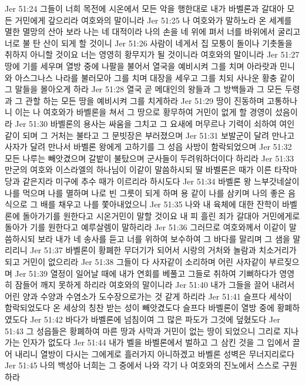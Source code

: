 Jer 51:24  그들이 너희 목전에 시온에서 모든 악을 행한대로 내가 바벨론과 갈대아 모든 거민에게 갚으리라 여호와의 말이니라
Jer 51:25  나 여호와가 말하노라 온 세계를 멸한 멸망의 산아 보라 나는 네 대적이라 나의 손을 네 위에 펴서 너를 바위에서 굴리고 너로 불 탄 산이 되게 할 것이니
Jer 51:26  사람이 네게서 집 모퉁이 돌이나 기촛돌을 취하지 아니할 것이요 너는 영영히 황무지가 될 것이니라 여호와의 말이니라
Jer 51:27  땅에 기를 세우며 열방 중에 나팔을 불어서 열국을 예비시켜 그를 치며 아라랏과 민니와 아스그나스 나라를 불러모아 그를 치며 대장을 세우고 그를 치되 사나운 황충 같이 그 말들을 몰아오게 하라
Jer 51:28  열국 곧 메대인의 왕들과 그 방백들과 그 모든 두령과 그 관할 하는 모든 땅을 예비시켜 그를 치게하라
Jer 51:29  땅이 진동하며 고통하나니 이는 나 여호와가 바벨론을 쳐서 그 땅으로 황무하여 거민이 없게 할 경영이 섰음이라
Jer 51:30  바벨론의 용사는 싸움을 그치고 그 요새에 머무르나 기력이 쇠하여 여인 같이 되며 그 거처는 불타고 그 문빗장은 부러졌으며
Jer 51:31  보발군이 달려 만나고 사자가 달려 만나서 바벨론 왕에게 고하기를 그 성읍 사방이 함락되었으며
Jer 51:32  모든 나루는 빼앗겼으며 갈밭이 불탔으며 군사들이 두려워하더이다 하리라
Jer 51:33  만군의 여호와 이스라엘의 하나님이 이같이 말씀하시되 딸 바벨론은 때가 이른 타작마당과 같은지라 미구에 추수 때가 이르리라 하시도다
Jer 51:34  바벨론 왕 느부갓네살이 나를 먹으며 나를 멸하며 나로 빈 그릇이 되게 하며 용 같이 나를 삼키며 나의 좋은 음식으로 그 배를 채우고 나를 쫓아내었으니
Jer 51:35  나와 내 육체에 대한 잔학이 바벨론에 돌아가기를 원한다고 시온거민이 말할 것이요 내 피 흘린 죄가 갈대아 거민에게로 돌아가 기를 원한다고 예루살렘이 말하리라
Jer 51:36  그러므로 여호와께서 이같이 말씀하시되 보라 내가 네 송사를 듣고 너를 위하여 보수하여 그 바다를 말리며 그 샘을 말리리니
Jer 51:37  바벨론이 황폐한 무더기가 되어서 시랑의 거처와 놀람과 치소거리가 되고 거민이 없으리라
Jer 51:38  그들이 다 사자같이 소리하며 어린 사자같이 부르짖으며
Jer 51:39  열정이 일어날 때에 내가 연회를 베풀고 그들로 취하여 기뻐하다가 영영히 잠들어 깨지 못하게 하리라 여호와의 말이니라
Jer 51:40  내가 그들을 끌어 내려서 어린 양과 수양과 수염소가 도수장으로가는 것 같게 하리라
Jer 51:41  슬프다 세삭이 함락되었도다 온 세상의 칭찬 받는 성이 빼앗겼도다 슬프다 바벨론이 열방 중에 황폐하였도다
Jer 51:42  바다가 바벨론에 넘침이여 그 많은 파도가 그것에 덮혔도다
Jer 51:43  그 성읍들은 황폐하여 마른 땅과 사막과 거민이 없는 땅이 되었으니 그리로 지나가는 인자가 없도다
Jer 51:44  내가 벨을 바벨론에서 벌하고 그 삼킨 것을 그 입에서 끌어 내리니 열방이 다시는 그에게로 흘러가지 아니하겠고 바벨론 성벽은 무너지리로다
Jer 51:45  나의 백성아 너희는 그 중에서 나와 각기 나 여호와의 진노에서 스스로 구원하라
